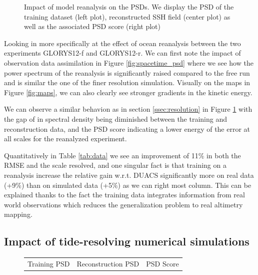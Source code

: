 \begin{bibunit}
\begin{figure}[h]
\begin{tabular}{ccc}
\end{tabular}
\vspace{-3mm}
\caption{
Impact of model reanalysis on the PSDs. We display the PSD of the training dataset (left plot), reconstructed SSH field (center plot) as well as the associated PSD score (right plot)}\vspace{-5mm}
\label{fig:reapsd}

\end{figure}

Looking in more specifically at the effect of ocean reanalysis between the two experiments GLORYS12-f and GLORYS12-r. We can first note the impact of observation data assimilation in Figure \ref{fig:spacetime_psd} where we see how the power spectrum of the reanalysis is significantly raised compared to the free run and is similar the one of the finer resolution simulation. Visually on the maps in Figure \ref{fig:maps}, we can also clearly see stronger gradients in the kinetic energy.

We can observe a similar behavion as in section \ref{ssec:resolution} in Figure \ref{fig:reapsd} with the gap of in spectral density being diminished between the training and reconstruction data, and the PSD score indicating a lower energy of the error at all scales for the reanalyzed experiment.

Quantitatively in Table \ref{tab:data} we see an improvement of 11\% in both the RMSE and the scale resolved, and one singular fact is that training on a reanalysis increase the relative gain w.r.t. DUACS significantly more on real data (+9\%) than on simulated data (+5\%) as we can right most column. This can be explained thanks to the fact the training data integrates information from real world observations which reduces the generalization problem to real altimetry mapping.

\subsection{Impact of tide-resolving numerical simulations}
\label{ssec:tide}
\begin{figure}[H]
\small
\begin{center}
\setlength{\tabcolsep}{1pt}
\begin{tabular}{ccc}

\hspace{3mm} Training PSD & 
\hspace{3mm} Reconstruction PSD & 
\hspace{3mm} PSD Score  \\


\end{tabular}
\end{center}
\end{figure}
\end{bibunit}
